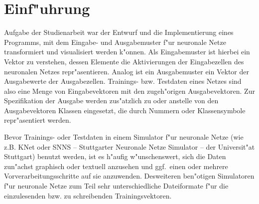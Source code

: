 \section{Einf"uhrung}
\label{einf}




Aufgabe der Studienarbeit war der Entwurf und die Implementierung eines
Programms, mit dem Eingabe- und Ausgabemuster f"ur neuronale Netze
transformiert und visualisiert werden k"onnen.
Als Eingabemuster ist hierbei ein Vektor zu verstehen, dessen Elemente
die Aktivierungen der Eingabezellen des neuronalen Netzes repr"asentieren.
Analog ist ein Ausgabemuster ein Vektor der Ausgabewerte der 
Ausgabezellen.
Trainings- bzw. Testdaten eines Netzes sind also
eine Menge von Eingabevektoren mit den zugeh"origen Ausgabevektoren.
Zur Spezifikation der Ausgabe werden zus"atzlich zu oder anstelle von den
Ausgabevektoren Klassen eingesetzt, die durch Nummern oder Klassensymbole
repr"asentiert werden.

Bevor Trainings- oder Testdaten in einem Simulator f"ur neuronale
Netze (wie z.B. KNet oder SNNS -- Stuttgarter Neuronale Netze Simulator --
der Universit"at Stuttgart) benutzt werden, ist es h"aufig w"unschenswert,
sich die Daten zun"achst graphisch oder textuell anzusehen und 
ggf.~einen oder mehrere Vorverarbeitungsschritte auf sie anzuwenden.
Desweiteren ben"otigen Simulatoren f"ur neuronale Netze zum Teil
sehr unterschiedliche Dateiformate f"ur die einzulesenden bzw.
zu schreibenden Trainingsvektoren.

